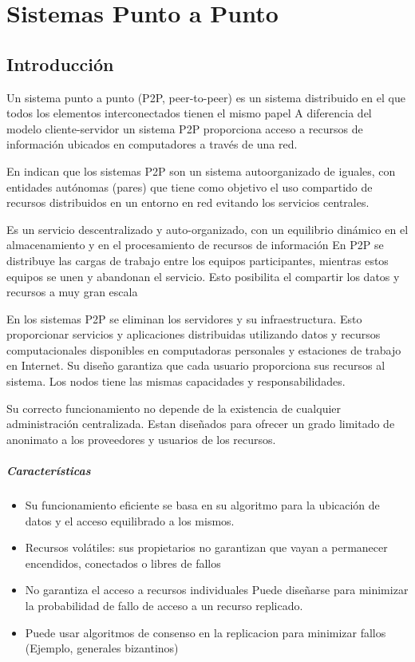 
\chapter{Sistemas Punto a Punto}
\label{ch:p2p}

\section{Introducción}
Un sistema punto a punto (P2P, peer-to-peer) es un sistema distribuido en el que todos los elementos interconectados tienen el mismo papel
A diferencia del modelo cliente-servidor un sistema P2P proporciona  acceso a recursos de información ubicados en computadores a través de una red.
 

 En \cite{Steinmetz2005} indican que los  sistemas P2P son un sistema autoorganizado de iguales, con entidades autónomas  (pares) que  tiene como objetivo el uso compartido de recursos distribuidos en un entorno en red evitando los servicios centrales.


Es un servicio descentralizado y auto-organizado, con un equilibrio dinámico en  el almacenamiento  y en el procesamiento de recursos de información
En P2P se distribuye las cargas de trabajo entre los equipos participantes, mientras  estos equipos se unen y abandonan el servicio. Esto posibilita el compartir los  datos y recursos a muy gran escala 
 
En los sistemas P2P se  eliminan los servidores y su infraestructura. Esto proporcionar servicios y aplicaciones distribuidas utilizando datos y recursos computacionales disponibles en computadoras personales y estaciones de trabajo en Internet.  Su diseño garantiza que cada usuario proporciona sus recursos al sistema.  Los nodos  tiene las mismas capacidades y responsabilidades.
 
Su correcto funcionamiento no depende de la existencia de cualquier administración centralizada. Estan diseñados para ofrecer un grado limitado de anonimato a los proveedores y usuarios de los recursos. 
 
 \paragraph{Características} 
 \begin{itemize}
 	\item  Su funcionamiento eficiente se basa en su algoritmo para la ubicación de datos y el acceso equilibrado a los mismos. 
 	\item Recursos volátiles: sus propietarios no garantizan que vayan a permanecer encendidos, conectados o libres de fallos 
 	\item No garantiza el acceso a recursos individuales  
 	Puede diseñarse para minimizar la probabilidad de fallo de acceso a un recurso replicado. 
 	\item Puede usar algoritmos de consenso en la replicacion para minimizar fallos (Ejemplo, generales bizantinos)
	
 \end{itemize}
 
